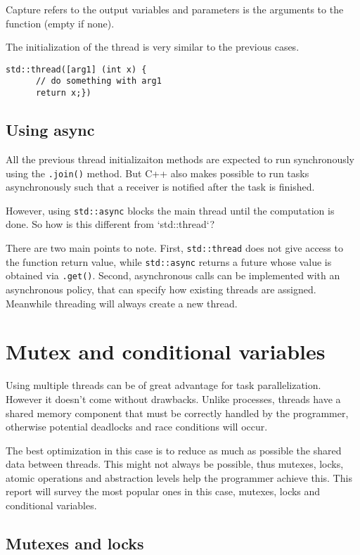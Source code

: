 \documentclass[conference]{IEEEtran}
\begin{document}
Capture refers to the output variables and parameters is the arguments to the function (empty if none).

The initialization of the thread is very similar to the previous cases.

\begin{lstlisting}
std::thread([arg1] (int x) {
      // do something with arg1
      return x;})
\end{lstlisting}

\subsection{Using async}

All the previous thread initializaiton methods are expected to run synchronously using the \verb|.join()| method. But C++ also makes possible to run tasks asynchronously such that a receiver is notified after the task is finished. 

However, using \verb|std::async| blocks the main thread until the computation is done. So how is this different from `std::thread`? 

There are two main points to note. First, \verb|std::thread| does not give access to the function return value, while \verb|std::async| returns a future whose value is obtained via \verb|.get()|. Second, asynchronous calls can be implemented with an asynchronous policy, that can specify how existing threads are assigned. Meanwhile threading will always create a new thread.

\section{Mutex and conditional variables}

Using multiple threads can be of great advantage for task parallelization. However it doesn't come without drawbacks. Unlike processes, threads have a shared memory component that must be correctly handled by the programmer, otherwise potential deadlocks and race conditions will occur. 

The best optimization in this case is to reduce as much as possible the shared data between threads. This might not always be possible, thus mutexes, locks, atomic operations and abstraction levels help the programmer achieve this. This report will survey the most popular ones in this case, mutexes, locks and conditional variables.

\subsection{Mutexes and locks}
\end{document}
